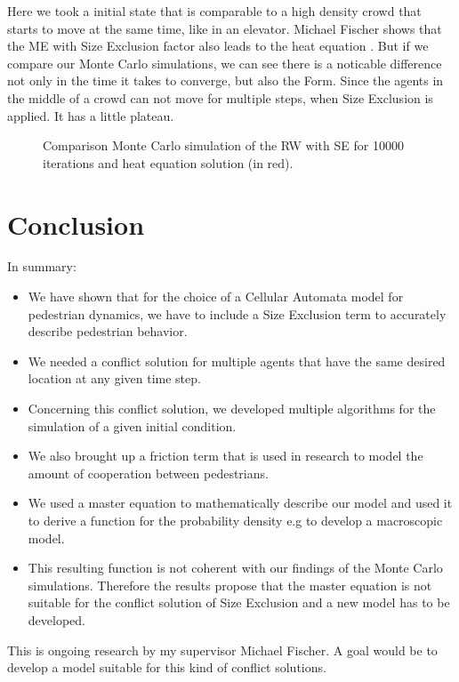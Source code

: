 Here we took a initial state that is comparable to a high density crowd that starts to move at the same time, like in an elevator.
Michael Fischer shows that the ME with Size Exclusion factor also leads to the heat equation \autocite{Michi}. 
But if we compare our Monte Carlo simulations, we can see there is a noticable difference not only in the time it takes to converge, 
but also the Form. Since the agents in the middle of a crowd can not move for multiple steps, when Size Exclusion is applied.
It has a little plateau. 

\begin{figure}
   \begin{center}
      
   \end{center}
   \label{fig:fig11}
   \caption{Comparison Monte Carlo simulation of the RW with SE for 10000 iterations and heat equation solution (in red).}
\end{figure}

\newpage
\section{Conclusion}
In summary:
\begin{itemize}
   \item We have shown that for the choice of a Cellular Automata model for pedestrian dynamics, we have to include a Size Exclusion term to accurately describe pedestrian behavior.
   \item We needed a conflict solution for multiple agents that have the same desired location at any given time step.
   \item Concerning this conflict solution, we developed multiple algorithms for the simulation of a given initial condition.
   \item We also brought up a friction term that is used in research to model the amount of cooperation between pedestrians.
   \item We used a master equation to mathematically describe our model and used it to derive a function for the probability density e.g to develop a macroscopic model.
   \item This resulting function is not coherent with our findings of the Monte Carlo simulations.
   Therefore the results propose that the master equation is not suitable for the conflict solution of Size Exclusion and a new model has to be developed. 
\end{itemize} 
This is ongoing research by my supervisor Michael Fischer. 
A goal would be to develop a model suitable for this kind of conflict solutions. 


\newpage





